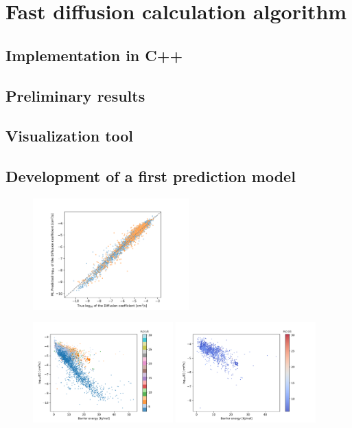 \documentclass[main]{subfiles}
\begin{document}
\section{Fast diffusion calculation algorithm}

\subsection{Implementation in C++}

\subsection{Preliminary results}

\subsection{Visualization tool}


\subsection{Development of a first prediction model}

\begin{figure}[ht]
  \centering
    \includegraphics[width=6cm]{figures/5-diffusion/diffusion_prediction.pdf}
    \caption{}
    \label{fgr:}
\end{figure}

\begin{figure}[ht]
  \centering
    \includegraphics[width=0.48\textwidth]{figures/5-diffusion/difflog_barrier_Df_uff.pdf}
    \includegraphics[width=0.48\textwidth]{figures/5-diffusion/difflog_barrier_Df_uff_2.pdf}
    \caption{}\label{fgr:}
\end{figure}
\end{document}
